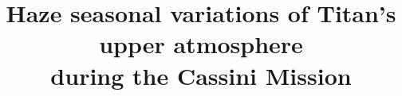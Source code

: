 \documentclass[manuscript,linenumbers]{aastex63}
\begin{document}
\title{Haze seasonal variations of Titan's upper atmosphere\\during the Cassini Mission}













\end{document}
